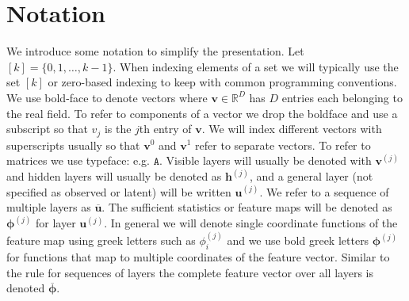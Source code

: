 \documentclass{article} %
\begin{document}


\section{Notation}

We introduce some notation to simplify the presentation. Let
$[k]=\{0,1,\ldots,k-1\}$.  When indexing elements of a set we will
typically use the set $[k]$ or zero-based indexing to keep with common
programming conventions.  We use bold-face to denote vectors where
$\mathbf{v}\in\mathbb{R}^D$ has $D$ entries each belonging to the real
field.  To refer to components of a vector we drop the boldface and
use a subscript so that $v_j$ is the $j$th entry of $\mathbf{v}$.  We
will index different vectors with superscripts usually so that
$\mathbf{v}^0$ and $\mathbf{v}^1$ refer to separate vectors. To refer
to matrices we use typeface: e.g. $\mathtt{A}$. Visible layers will
usually be denoted with $\mathbf{v}^{(j)}$ and hidden layers will
usually be denoted as $\mathbf{h}^{(j)}$, and a general layer (not
specified as observed or latent) will be written $\mathbf{u}^{(j)}$.
We refer to a sequence of multiple layers as $\overline{\mathbf{u}}$.
The sufficient statistics or feature maps will be denoted as $\boldsymbol{\phi}^{(j)}$
for layer $\mathbf{u}^{(j)}$.  In general we will denote single coordinate functions of the
feature map using greek letters such as $\phi^{(j)}_i$ and we use bold greek letters
$\boldsymbol{\phi}^{(j)}$ for
functions that map to multiple coordinates of the feature vector. Similar to the rule
for sequences of layers the complete feature vector over all layers is denoted $\overline{\boldsymbol{\phi}}$.
\end{document}
